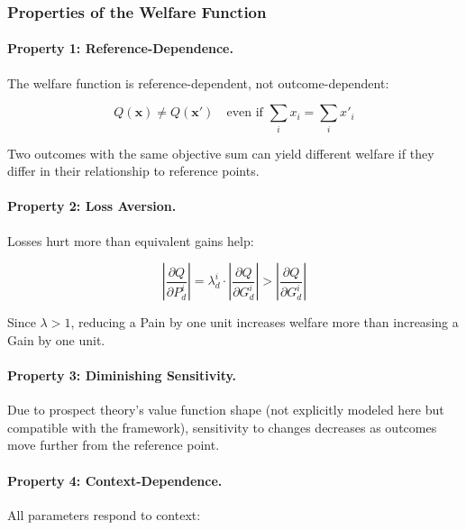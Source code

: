 \subsubsection{Properties of the Welfare Function}

\paragraph{Property 1: Reference-Dependence.}
The welfare function is reference-dependent, not outcome-dependent:

\begin{equation}
Q(\mathbf{x}) \neq Q(\mathbf{x}') \quad \text{even if } \sum_i x_i = \sum_i x'_i
\end{equation}

Two outcomes with the same objective sum can yield different welfare 
if they differ in their relationship to reference points.

\paragraph{Property 2: Loss Aversion.}
Losses hurt more than equivalent gains help:

\begin{equation}
\left| \frac{\partial Q}{\partial P^i_d} \right| = \lambda^i_d \cdot \left| \frac{\partial Q}{\partial G^i_d} \right| > \left| \frac{\partial Q}{\partial G^i_d} \right|
\end{equation}

Since $\lambda > 1$, reducing a Pain by one unit increases welfare more 
than increasing a Gain by one unit.

\paragraph{Property 3: Diminishing Sensitivity.}
Due to prospect theory's value function shape (not explicitly modeled here 
but compatible with the framework), sensitivity to changes decreases 
as outcomes move further from the reference point.

\paragraph{Property 4: Context-Dependence.}
All parameters respond to context:

